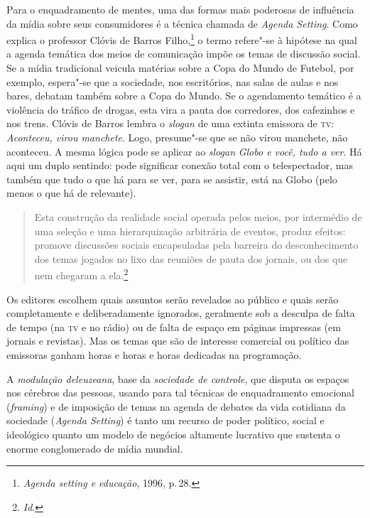 Para o enquadramento de mentes, uma das formas mais poderosas de
influência da mídia sobre seus consumidores é a técnica chamada de
\emph{Agenda Setting}. Como explica o professor Clóvis de Barros Filho,\footnote{\emph{Agenda setting e educação}, 1996, p.\,28.} o termo refere"-se à hipótese na qual a agenda temática
dos meios de comunicação impõe os temas de discussão social. Se a mídia
tradicional veicula matérias sobre a Copa do Mundo de Futebol, por
exemplo, espera"-se que a sociedade, nos escritórios, nas salas de aulas
e nos bares, debatam também sobre a Copa do Mundo. Se o agendamento
temático é a violência do tráfico de drogas, esta vira a pauta dos
corredores, dos cafezinhos e nos trens. Clóvis de Barros lembra o
\emph{slogan} de uma extinta emissora de \textsc{tv}: \emph{Aconteceu, virou
manchete}. Logo, presume"-se que se não virou manchete, não aconteceu.
A mesma lógica pode se aplicar ao \emph{slogan} \emph{Globo e você,
tudo a ver}. Há aqui um duplo sentindo: pode significar conexão total
com o telespectador, mas também que tudo o que há para se ver, para se
assistir, está na Globo (pelo menos o que há de relevante).

\begin{quote}
Esta construção da realidade social operada pelos meios, por
intermédio de uma seleção e uma hierarquização arbitrária de eventos,
produz efeitos: promove discussões sociais encapsuladas pela barreira do
desconhecimento dos temas jogados no lixo das reuniões de pauta dos
jornais, ou dos que nem chegaram a ela.\footnote{\textit{Id}.}
\end{quote}

Os editores escolhem quais assuntos serão revelados ao público e quais
serão completamente e deliberadamente ignorados, geralmente sob a
desculpa de falta de tempo (na \textsc{tv} e no rádio) ou de falta de espaço em
páginas impressas (em jornais e revistas). Mas os temas que são de
interesse comercial ou político das emissoras ganham horas e horas e
horas dedicadas na programação.

A \emph{modulação deleuzeana}, base da \emph{sociedade de controle}, que
disputa os espaços nos cérebros das pessoas, usando para tal técnicas de
enquadramento emocional (\emph{framing}) e de imposição de temas na
agenda de debates da vida cotidiana da sociedade (\emph{Agenda Setting})
é tanto um recurso de poder político, social e ideológico quanto um
modelo de negócios altamente lucrativo que sustenta o enorme
conglomerado de mídia mundial.

